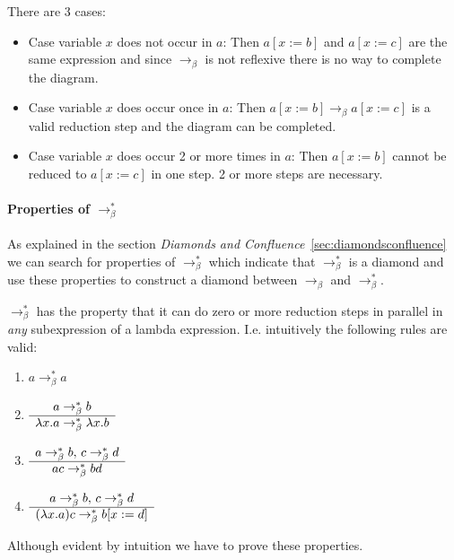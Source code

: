There are 3 cases:
\begin{itemize}
\item
  Case variable $x$ does not occur in $a$: Then $a[x:=b] $ and $a[x:=c]$
  are the same expression and since $\to_\beta$ is not reflexive there is no
  way to complete the diagram.

\item
  Case variable $x$ does occur once in $a$: Then $a[x:=b] \to_\beta
  a[x:=c]$ is a valid reduction step and the diagram can be completed.

\item
  Case variable $x$ does occur 2 or more times in $a$: Then $a[x:=b]$ cannot
  be reduced to $a[x:=c]$ in one step. 2 or more steps are necessary.
\end{itemize}



\paragraph{Properties of $\to_\beta^*$}
As explained in the section \emph{Diamonds and
  Confluence}~\ref{sec:diamondsconfluence}
we can search for properties of  $\to_\beta^*$ which indicate that
$\to_\beta^*$ is a diamond and use these properties to construct a diamond
between $\to_\beta$ and $\to_\beta^*$.

$\to_\beta^*$ has the property that it can do zero or more reduction steps in
parallel in \emph{any} subexpression of a lambda expression. I.e. intuitively
the following rules are valid:
\begin{enumerate}
\item
  $a \to_\beta^* a$
\item
  $\begin{array}{c} a \to_\beta^* b \\ \hline \lambda x.a \to_\beta^* \lambda x.b\end{array}$
\item
  $\begin{array}{c} a \to_\beta^* b, \, c \to_\beta^* d \\ \hline ac \to_\beta^* bd\end{array}$
\item
  $\begin{array}{c} a \to_\beta^* b, \, c \to_\beta^* d \\ \hline (\lambda x.a) c \to_\beta^* b[x:=d]\end{array} $
\end{enumerate}

Although evident by intuition we have to prove these properties.

